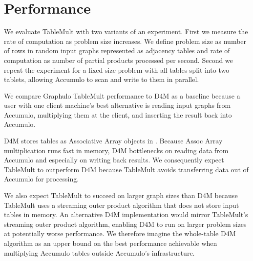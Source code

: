 
\section{Performance}
\label{sPerformance}

We evaluate TableMult with two variants of an experiment. 
First we measure the rate of computation as problem size increases.
We define problem size as number of rows in random input graphs 
represented as adjacency tables
and rate of computation as number of partial products processed per second.
Second we repeat the experiment for a fixed size problem with all tables split into two tablets,
allowing Accumulo to scan and write to them in parallel.



We compare Graphulo TableMult performance to D4M as a baseline because 
a user with one client machine's best alternative is reading input graphs from Accumulo, 
multiplying them at the client, and inserting the result back into Accumulo.

D4M stores tables as Associative Array objects in \matlab{}.  
Because Assoc Array multiplication runs fast in memory, 
D4M bottlenecks on reading data from Accumulo and especially on writing back results.
We consequently expect TableMult to outperform D4M 
because TableMult avoids transferring data out of Accumulo for processing. 

We also expect TableMult to succeed on larger graph sizes than D4M because TableMult
uses a streaming outer product algorithm that does not store input tables in memory.
An alternative D4M implementation would mirror TableMult's streaming outer product algorithm,
enabling D4M to run on larger problem sizes at potentially worse performance.
We therefore imagine the whole-table D4M algorithm as an upper bound on the best performance 
achievable when multiplying Accumulo tables outside Accumulo's infrastructure.

